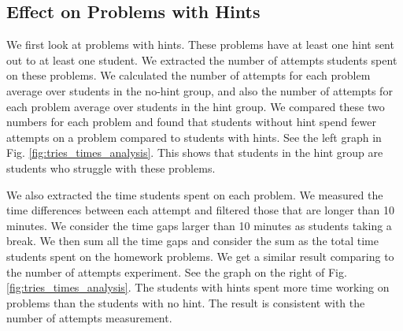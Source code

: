 \documentclass{article} %
\begin{document}
\subsection{Effect on Problems with Hints}
We first look at problems with hints. These problems have at least one hint sent out to at least one student. We extracted the number of attempts students spent on these problems. We calculated the number of attempts for each problem average over students in the no-hint group, and also the number of attempts for each problem average over students in the hint group. We compared these two numbers for each problem and found that students without hint spend fewer attempts on a problem compared to students with hints. See the left graph in Fig. \ref{fig:tries_times_analysis}. This shows that students in the hint group are students who struggle with these problems.

We also extracted the time students spent on each problem. We measured the time differences between each attempt and filtered those that are longer than 10 minutes. We consider the time gaps larger than 10 minutes as students taking a break. We then sum all the time gaps and consider the sum as the total time students spent on the homework problems. We get a similar result comparing to the number of attempts experiment. See the graph on the right of Fig. \ref{fig:tries_times_analysis}. The students with hints spent more time working on problems than the students with no hint. The result is consistent with the number of attempts measurement.
\end{document}
